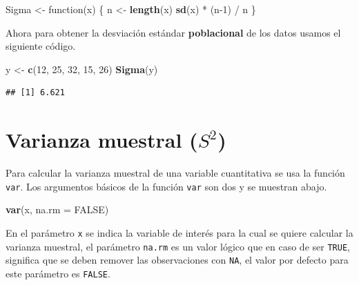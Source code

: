 \documentclass[10pt,]{krantz}
\makeatletter
\newenvironment{Shaded}{\begin{snugshade}}{\end{snugshade}}
\newcommand{\KeywordTok}[1]{\textcolor[rgb]{0.13,0.29,0.53}{\textbf{{#1}}}}
\newcommand{\DataTypeTok}[1]{\textcolor[rgb]{0.13,0.29,0.53}{{#1}}}
\newcommand{\DecValTok}[1]{\textcolor[rgb]{0.00,0.00,0.81}{{#1}}}
\newcommand{\StringTok}[1]{\textcolor[rgb]{0.31,0.60,0.02}{{#1}}}
\newcommand{\OtherTok}[1]{\textcolor[rgb]{0.56,0.35,0.01}{{#1}}}
\newcommand{\NormalTok}[1]{{#1}}
\newenvironment{kframe}{%
\medskip{}
\setlength{\fboxsep}{.8em}
 \def\at@end@of@kframe{}%
 \ifinner\ifhmode%
  \def\at@end@of@kframe{\end{minipage}}%
  \begin{minipage}{\columnwidth}%
 \fi\fi%
 \def\FrameCommand##1{\hskip\@totalleftmargin \hskip-\fboxsep
 \colorbox{shadecolor}{##1}\hskip-\fboxsep
     \hskip-\linewidth \hskip-\@totalleftmargin \hskip\columnwidth}%
 \MakeFramed {\advance\hsize-\width
   \@totalleftmargin\z@ \linewidth\hsize
   \@setminipage}}%
 {\par\unskip\endMakeFramed%
 \at@end@of@kframe}
\renewenvironment{Shaded}{\begin{kframe}}{\end{kframe}}
\makeatother
\begin{document}
\begin{Shaded}
\begin{Highlighting}[]
\NormalTok{Sigma <-}\StringTok{ }\NormalTok{function(x) \{}
  \NormalTok{n <-}\StringTok{ }\KeywordTok{length}\NormalTok{(x)}
  \KeywordTok{sd}\NormalTok{(x) *}\StringTok{ }\NormalTok{(n}\DecValTok{-1}\NormalTok{) /}\StringTok{ }\NormalTok{n}
\NormalTok{\} }
\end{Highlighting}
\end{Shaded}

Ahora para obtener la desviación estándar \textbf{poblacional} de los
datos usamos el siguiente código.

\begin{Shaded}
\begin{Highlighting}[]
\NormalTok{y <-}\StringTok{ }\KeywordTok{c}\NormalTok{(}\DecValTok{12}\NormalTok{, }\DecValTok{25}\NormalTok{, }\DecValTok{32}\NormalTok{, }\DecValTok{15}\NormalTok{, }\DecValTok{26}\NormalTok{)}
\KeywordTok{Sigma}\NormalTok{(y)}
\end{Highlighting}
\end{Shaded}

\begin{verbatim}
## [1] 6.621
\end{verbatim}

\section{\texorpdfstring{Varianza muestral (\(S^2\)) 
}{Varianza muestral (S\^{}2)  }}\label{varianza-muestral-s2}

Para calcular la varianza muestral de una variable cuantitativa se usa
la función \texttt{var}. Los argumentos básicos de la función
\texttt{var} son dos y se muestran abajo.

\begin{Shaded}
\begin{Highlighting}[]
\KeywordTok{var}\NormalTok{(x, }\DataTypeTok{na.rm =} \OtherTok{FALSE}\NormalTok{)}
\end{Highlighting}
\end{Shaded}

En el parámetro \texttt{x} se indica la variable de interés para la cual
se quiere calcular la varianza muestral, el parámetro \texttt{na.rm} es
un valor lógico que en caso de ser \texttt{TRUE}, significa que se deben
remover las observaciones con \texttt{NA}, el valor por defecto para
este parámetro es \texttt{FALSE}.
\end{document}
